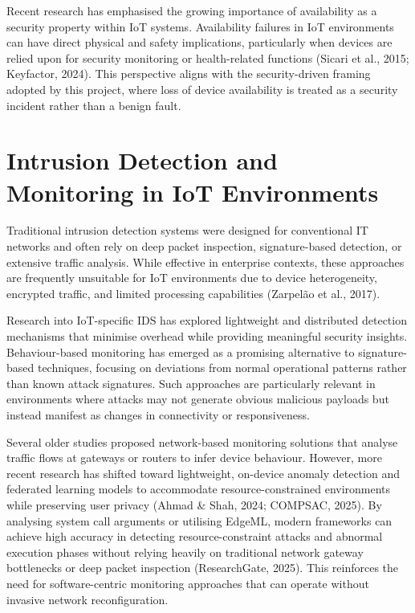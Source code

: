 Recent research has emphasised the growing importance of availability as a security property within IoT systems. Availability failures in IoT environments can have direct physical and safety implications, particularly when devices are relied upon for security monitoring or health-related functions (Sicari et al., 2015; Keyfactor, 2024). This perspective aligns with the security-driven framing adopted by this project, where loss of device availability is treated as a security incident rather than a benign fault.

\section{Intrusion Detection and Monitoring in IoT Environments}

Traditional intrusion detection systems were designed for conventional IT networks and often rely on deep packet inspection, signature-based detection, or extensive traffic analysis. While effective in enterprise contexts, these approaches are frequently unsuitable for IoT environments due to device heterogeneity, encrypted traffic, and limited processing capabilities (Zarpelão et al., 2017).

Research into IoT-specific IDS has explored lightweight and distributed detection mechanisms that minimise overhead while providing meaningful security insights. Behaviour-based monitoring has emerged as a promising alternative to signature-based techniques, focusing on deviations from normal operational patterns rather than known attack signatures. Such approaches are particularly relevant in environments where attacks may not generate obvious malicious payloads but instead manifest as changes in connectivity or responsiveness.

Several older studies proposed network-based monitoring solutions that analyse traffic flows at gateways or routers to infer device behaviour. However, more recent research has shifted toward lightweight, on-device anomaly detection and federated learning models to accommodate resource-constrained environments while preserving user privacy (Ahmad \& Shah, 2024; COMPSAC, 2025). By analysing system call arguments or utilising EdgeML, modern frameworks can achieve high accuracy in detecting resource-constraint attacks and abnormal execution phases without relying heavily on traditional network gateway bottlenecks or deep packet inspection (ResearchGate, 2025). This reinforces the need for software-centric monitoring approaches that can operate without invasive network reconfiguration.

